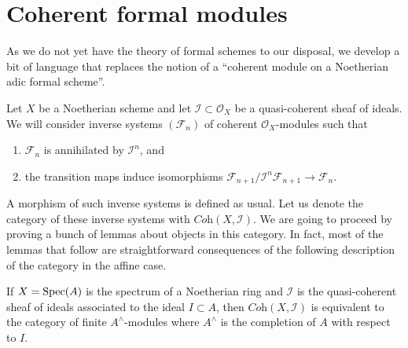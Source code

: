 \section{Coherent formal modules}
\label{section-coherent-formal}

\noindent
As we do not yet have the theory of formal schemes to our disposal, we
develop a bit of language that replaces the notion of a ``coherent module on a
Noetherian adic formal scheme''.

\medskip\noindent
Let $X$ be a Noetherian scheme and let $\mathcal{I} \subset \mathcal{O}_X$
be a quasi-coherent sheaf of ideals. We will consider inverse
systems $(\mathcal{F}_n)$ of coherent $\mathcal{O}_X$-modules such that
\begin{enumerate}
\item $\mathcal{F}_n$ is annihilated by $\mathcal{I}^n$, and
\item the transition maps induce isomorphisms
$\mathcal{F}_{n + 1}/\mathcal{I}^n\mathcal{F}_{n + 1} \to \mathcal{F}_n$.
\end{enumerate}
A morphism of such inverse systems is defined as usual.
Let us denote the category of these inverse systems with
$\textit{Coh}(X, \mathcal{I})$. We are going to proceed by proving
a bunch of lemmas about objects in this category. In fact, most
of the lemmas that follow are straightforward consequences of the following
description of the category in the affine case.

\begin{lemma}
\label{lemma-inverse-systems-affine}
If $X = \mathop{\mathrm{Spec}}(A)$ is the spectrum of a Noetherian ring and
$\mathcal{I}$ is the quasi-coherent sheaf of ideals associated to the ideal
$I \subset A$, then $\textit{Coh}(X, \mathcal{I})$ is equivalent to the
category of finite $A^\wedge$-modules where $A^\wedge$ is the completion
of $A$ with respect to $I$.
\end{lemma}

